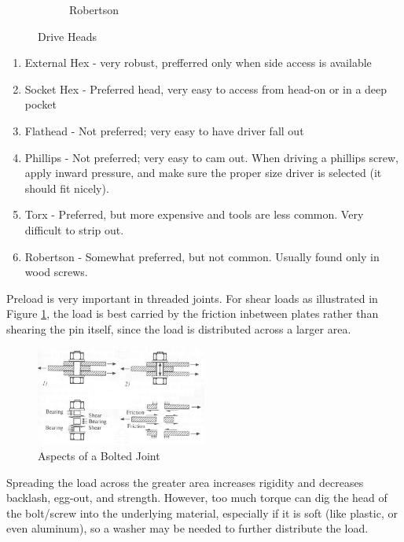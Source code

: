 \documentclass[10pt,letterpaper]{book}
\begin{document}
\begin{figure}[H]
\begin{subfigure}[b]{.15\linewidth}
			\caption{Robertson}
		\end{subfigure}
		\caption{Drive Heads}
	\end{figure}
	
	\begin{enumerate}[label=\alph*]
		\item External Hex - very robust, prefferred only when side access is available
		\item Socket Hex - Preferred head, very easy to access from head-on or in a deep pocket
		\item Flathead - Not preferred; very easy to have driver fall out
		\item Phillips - Not preferred; very easy to cam out. When driving a phillips screw, apply inward pressure, and make sure the proper size driver is selected (it should fit nicely).
		\item Torx - Preferred, but more expensive and tools are less common. Very difficult to strip out.
		\item Robertson - Somewhat preferred, but not common. Usually found only in wood screws.
	\end{enumerate}
	
	Preload is very important in threaded joints. For shear loads as illustrated in Figure \ref{fig:bolted_joint}, the load is best carried by the friction inbetween plates rather than shearing the pin itself, since the load is distributed across a larger area.
	
	\begin{figure}[H] \label{fig:bolted_joint} \centering
		\includegraphics[width=0.5\textwidth]{imgs/bolt_preload.png}
		\caption{Aspects of a Bolted Joint}
	\end{figure}
	
	Spreading the load across the greater area increases rigidity and decreases backlash, egg-out, and strength. However, too much torque can dig the head of the bolt/screw into the underlying material, especially if it is soft (like plastic, or even aluminum), so a washer may be needed to further distribute the load.
	
\end{document}
